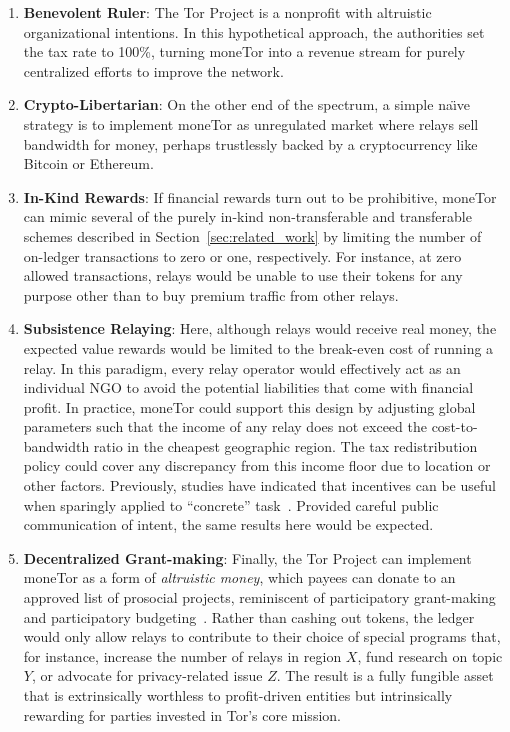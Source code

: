 \begin{enumerate}

\item \textbf{Benevolent Ruler}: The Tor Project is a nonprofit with altruistic organizational intentions.
  In this hypothetical approach, the authorities set the tax rate to 100\%, turning moneTor into a revenue stream for purely centralized efforts to improve the network.

\item \textbf{Crypto-Libertarian}: On the other end of the spectrum, a simple na\"{\i}ve strategy is to implement moneTor as unregulated market where relays sell bandwidth for money, perhaps trustlessly backed by a cryptocurrency like Bitcoin or Ethereum.

\item \textbf{In-Kind Rewards}: If financial rewards turn out to be prohibitive, moneTor can mimic several of the purely in-kind non-transferable and transferable schemes described in Section~\ref{sec:related_work} by limiting the number of on-ledger transactions to zero or one, respectively.
  For instance, at zero allowed transactions, relays would be unable to use their tokens for any purpose other than to buy premium traffic from other relays.

\item \textbf{Subsistence Relaying}: Here, although relays would
  receive real money, the expected value rewards would be limited to the break-even cost of running a relay.
In this paradigm, every relay operator would effectively act as an individual NGO to avoid the potential liabilities that come with financial profit.
In practice, moneTor could support this design by adjusting global parameters such that the income of any relay does not exceed the cost-to-bandwidth ratio in the cheapest geographic region.
The tax redistribution policy could cover any discrepancy from this income floor due to location or other factors.
Previously, studies have indicated that incentives can be useful when sparingly applied to ``concrete'' task~\cite{10.1257/jep.25.4.191, 10.1086/431263}.
Provided careful public communication of intent, the same results here
would be expected.

\item \textbf{Decentralized Grant-making}: Finally, the Tor Project can implement moneTor as a form of \emph{altruistic money}, which payees can donate to an approved list of prosocial projects, reminiscent of participatory grant-making and participatory budgeting~\cite{dinh2020universal}.
Rather than cashing out tokens, the ledger would only allow relays to contribute to their choice of special programs that, for instance, increase the number of relays in region $X$, fund research on topic $Y$, or advocate for privacy-related issue $Z$.
The result is a fully fungible asset that is extrinsically worthless to profit-driven entities but intrinsically rewarding for parties invested in Tor's core mission.

\end{enumerate}

